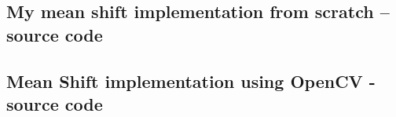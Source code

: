 \documentclass[a4paper]{article}
\begin{document}
\subsection{My mean shift implementation from scratch -- source code}
\label{app:mean_shift_mine}



\newpage
\subsection{Mean Shift implementation using OpenCV - source code}
\label{app:mean_shift_opencv}

\end{document}
